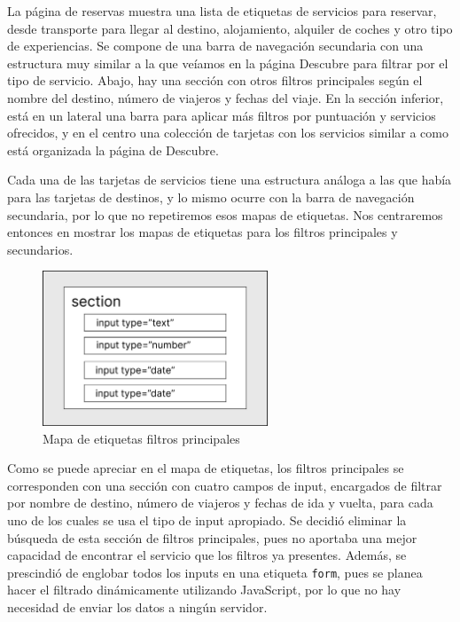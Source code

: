 \documentclass[11pt, a4paper]{book}
\begin{document}
    La página de reservas muestra una lista de etiquetas de servicios para reservar, desde transporte para llegar al destino, alojamiento, alquiler de coches y otro tipo de experiencias. Se compone de una barra de navegación secundaria con una estructura muy similar a la que veíamos en la página Descubre para filtrar por el tipo de servicio. Abajo, hay una sección con otros filtros principales según el nombre del destino, número de viajeros y fechas del viaje. En la sección inferior, está en un lateral una barra para aplicar más filtros por puntuación y servicios ofrecidos, y en el centro una colección de tarjetas con los servicios similar a como está organizada la página de Descubre. 

    Cada una de las tarjetas de servicios tiene una estructura análoga a las que había para las tarjetas de destinos, y lo mismo ocurre con la barra de navegación secundaria, por lo que no repetiremos esos mapas de etiquetas. Nos centraremos entonces en mostrar los mapas de etiquetas para los filtros principales y secundarios.

	\begin{figure} [H]
		\centering
		\includegraphics[width=0.6\textwidth]{HTML/Etiq-filtros-principales.jpg}
		\caption{Mapa de etiquetas filtros principales}
	\end{figure}

    Como se puede apreciar en el mapa de etiquetas, los filtros principales se corresponden con una sección con cuatro campos de input, encargados de filtrar por nombre de destino, número de viajeros y fechas de ida y vuelta, para cada uno de los cuales se usa el tipo de input apropiado. Se decidió eliminar la búsqueda de esta sección de filtros principales, pues no aportaba una mejor capacidad de encontrar el servicio que los filtros ya presentes. Además, se prescindió de englobar todos los inputs en una etiqueta \texttt{form}, pues se planea hacer el filtrado dinámicamente utilizando JavaScript, por lo que no hay necesidad de enviar los datos a ningún servidor.
\end{document}
